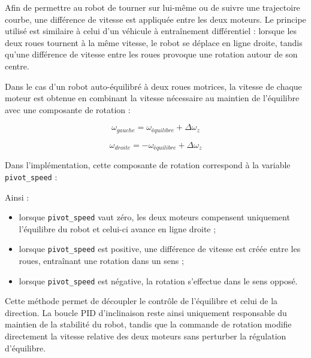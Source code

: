 Afin de permettre au robot de tourner sur lui-même ou de suivre une trajectoire courbe, une différence de vitesse est appliquée entre les deux moteurs. Le principe utilisé est similaire à celui d'un véhicule à entraînement différentiel : lorsque les deux roues tournent à la même vitesse, le robot se déplace en ligne droite, tandis qu'une différence de vitesse entre les roues provoque une rotation autour de son centre.

Dans le cas d'un robot auto-équilibré à deux roues motrices, la vitesse de chaque moteur est obtenue en combinant la vitesse nécessaire au maintien de l'équilibre avec une composante de rotation :

$$
\omega_{gauche} = \omega_{équilibre} + \Delta\omega_{z}
$$

$$
\omega_{droite} = -\omega_{équilibre} + \Delta\omega_{z}
$$

Dans l'implémentation, cette composante de rotation correspond à la variable \texttt{pivot\_speed} :


Ainsi :
\begin{itemize}
    \item lorsque \texttt{pivot\_speed} vaut zéro, les deux moteurs compensent uniquement l'équilibre du robot et celui-ci avance en ligne droite ;
    \item lorsque \texttt{pivot\_speed} est positive, une différence de vitesse est créée entre les roues, entraînant une rotation dans un sens ;
    \item lorsque \texttt{pivot\_speed} est négative, la rotation s'effectue dans le sens opposé.
\end{itemize}

Cette méthode permet de découpler le contrôle de l'équilibre et celui de la direction. La boucle PID d'inclinaison reste ainsi uniquement responsable du maintien de la stabilité du robot, tandis que la commande de rotation modifie directement la vitesse relative des deux moteurs sans perturber la régulation d'équilibre.